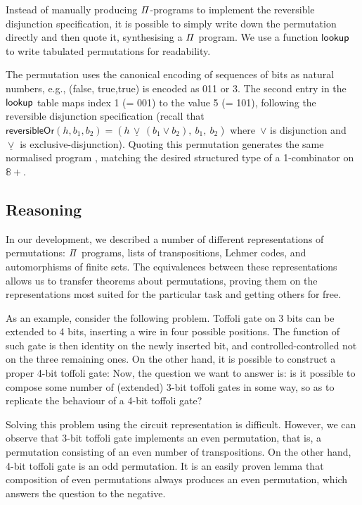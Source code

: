 Instead of manually producing $\mathit{\Pi}$-programs to implement the reversible disjunction specification, it is possible
to simply write down the permutation directly and then quote it, synthesising a $\mathit{\Pi}$ program. We use a function
$\operatorname{\mathsf{lookup}}$ to write tabulated permutations for readability.

\medskip
\resetperm{}

\noindent
The permutation uses the canonical encoding of sequences of bits as natural numbers, e.g., {(\textsf{false},
\textsf{true},\textsf{true})} is encoded as 011 or 3. The second entry in the $\operatorname{\mathsf{lookup}}$ table maps index 1 (= 001)
to the value 5 (= 101), following the reversible disjunction specification (recall that
$\mathsf{reversibleOr}(h,b_1,b_2) = (h \,\underline{\vee}\, (b_1 \vee b_2), ~b_1, ~b_2)$ where~$\vee$ is disjunction
and~$\underline{\vee}$ is exclusive-disjunction). Quoting this permutation generates the same normalised program
, matching the desired structured type of a 1-combinator on $\mathbb{8}+$.

\subsection{Reasoning}

In our development, we described a number of different representations of permutations: $\mathit{\Pi}$ programs, lists of
transpositions, Lehmer codes, and automorphisms of finite sets. The equivalences between these representations allows us
to transfer theorems about permutations, proving them on the representations most suited for the particular task and
getting others for free.

As an example, consider the following problem. Toffoli gate on 3 bits can be extended to 4 bits, inserting a wire in
four possible positions. The function of such gate is then identity on the newly inserted bit, and controlled-controlled
not on the three remaining ones.
\medskip
\extendedToffoli{}
\baselineskip
On the other hand, it is possible to construct a proper 4-bit toffoli gate:
\medskip
\toffoli{}
\baselineskip
Now, the question we want to answer is: is it possible to compose some number of (extended) 3-bit toffoli gates in some way, so as to replicate the
behaviour of a 4-bit toffoli gate?

Solving this problem using the circuit representation is difficult. However, we can observe that 3-bit toffoli gate
implements an even permutation, that is, a permutation consisting of an even number of transpositions. On the other
hand, 4-bit toffoli gate is an odd permutation. It is an easily proven lemma that composition of even permutations
always produces an even permutation, which answers the question to the negative.
 

